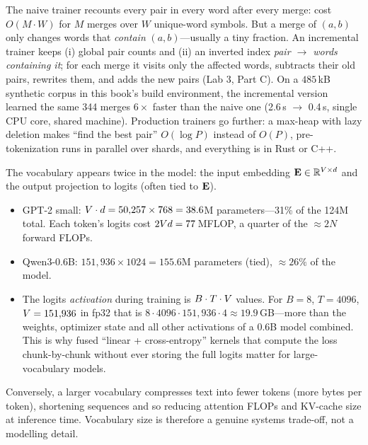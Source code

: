 \begin{systemslens}
The naive trainer recounts every pair in every word after every merge: cost
$O(M \cdot W)$ for $M$ merges over $W$ unique-word symbols. But a merge of $(a,b)$ only changes
words that \emph{contain} $(a,b)$---usually a tiny fraction. An incremental trainer keeps
(i) global pair counts and (ii) an inverted index \emph{pair $\to$ words containing it}; for each
merge it visits only the affected words, subtracts their old pairs, rewrites them, and adds the new
pairs (Lab 3, Part C). On a $485$\,kB synthetic corpus in this book's build environment, the
incremental version learned the same 344 merges $6\times$ faster than the naive one
(2.6\,s $\to$ 0.4\,s, single CPU core, shared machine). Production trainers go further: a
max-heap with lazy deletion makes ``find the best pair'' $O(\log P)$ instead of $O(P)$,
pre-tokenization runs in parallel over shards, and everything is in Rust or C++.
\end{systemslens}

\begin{napkinmath}
The vocabulary appears twice in the model: the input embedding $\mathbf{E}\in\mathbb{R}^{V\times d}$ and
the output projection to logits (often tied to $\mathbf{E}$).
\begin{itemize}
  \item GPT-2 small: $V\cdot d = 50{,}257\times 768 = 38.6$M parameters---31\% of the 124M
  total. Each token's logits cost $2V d = 77$\,MFLOP, a quarter of the $\approx 2N$ forward FLOPs.
  \item Qwen3-0.6B: $151{,}936\times 1024 = 155.6$M parameters (tied), $\approx 26\%$ of the model.
  \item The logits \emph{activation} during training is $B\cdot T\cdot V$ values. For
  $B=8$, $T=4096$, $V=151{,}936$ in fp32 that is $8\cdot 4096\cdot 151{,}936\cdot 4
  \approx 19.9$\,GB---more than the weights, optimizer state and all other activations of a 0.6B
  model combined. This is why fused ``linear + cross-entropy'' kernels that compute the loss
  chunk-by-chunk without ever storing the full logits matter for large-vocabulary models.
\end{itemize}
Conversely, a larger vocabulary compresses text into fewer tokens (more bytes per token), shortening
sequences and so reducing attention FLOPs and KV-cache size at inference time. Vocabulary size is
therefore a genuine systems trade-off, not a modelling detail.
\end{napkinmath}

